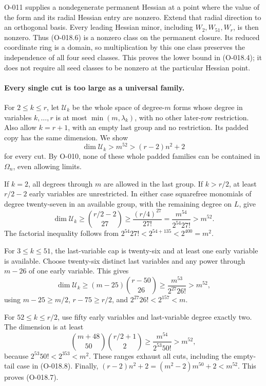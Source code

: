O-011 supplies a nondegenerate permanent Hessian at a point
where the value of the form and its radial Hessian entry
are nonzero. Extend that radial direction to an orthogonal
basis. Every leading Hessian minor, including $W_2,W_{51},W_r$,
is then nonzero. Thus (O-018.6) is a nonzero class on the
permanent closure. Its reduced coordinate ring is a domain,
so multiplication by this one class preserves the independence
of all four seed classes. This proves the lower bound in
(O-018.4); it does not require all seed classes to be nonzero
at the particular Hessian point.

\paragraph{Every single cut is too large as a universal family.}
For $2\leq k\leq r$, let $\mathcal U_k$ be the whole
space of degree-$m$ forms whose degree in variables
$k,\ldots,r$ is at most $\min(m,\lambda_k)$, with no
other later-row restriction. Also allow $k=r+1$, with an
empty last group and no restriction. Its padded copy has
the same dimension. We show
\[
                         \dim\mathcal U_k>m^{52}
                                    >(r-2)n^2+2         \tag{O-018.7}
\]
for every cut. By O-010, none of these whole padded families
can be contained in $\Omega_n$, even allowing limits.

If $k=2$, all degrees through $m$ are allowed in the last
group. If $k>r/2$, at least $r/2-2$ early variables are
unrestricted. In either case squarefree monomials of degree
twenty-seven in an available group, with the remaining degree
on $L$, give
\[
 \dim\mathcal U_k\geq\binom{r/2-2}{27}
       \geq\frac{(r/4)^{27}}{27!}
       =\frac{m^{54}}{2^{54}27!}>m^{52}.                \tag{O-018.8}
\]
The factorial inequality follows from
$2^{54}27!<2^{54+135}<2^{400}=m^2$.

For $3\leq k\leq51$, the last-variable cap is twenty-six
and at least one early variable is available. Choose
twenty-six distinct last variables and any power through
$m-26$ of one early variable. This gives
\[
 \dim\mathcal U_k\geq(m-25)\binom{r-50}{26}
       \geq\frac{m^{53}}{2^{27}26!}>m^{52},            \tag{O-018.9}
\]
using $m-25\geq m/2$, $r-75\geq r/2$, and
$2^{27}26!<2^{157}<m$.

For $52\leq k\leq r/2$, use fifty early variables and
last-variable degree exactly two. The dimension is at least
\[
 \binom{m+48}{50}\binom{r/2+1}{2}
       \geq\frac{m^{54}}{2^{53}50!}>m^{52},            \tag{O-018.10}
\]
because $2^{53}50!<2^{353}<m^2$.
These ranges exhaust all cuts, including the empty-tail
case in (O-018.8). Finally,
$(r-2)n^2+2=(m^2-2)m^{50}+2<m^{52}$.
This proves (O-018.7).

